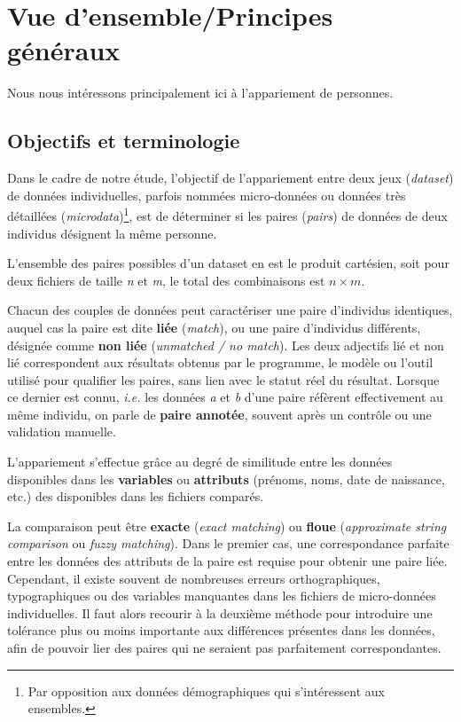 \documentclass[a4paper,12pt,twoside]{book}
\begin{document}
		\section{Vue d'ensemble/Principes généraux}
		
		    Nous nous intéressons principalement ici à l'appariement de personnes.
			    \subsection{Objectifs et terminologie}
			 
			    Dans le cadre de notre étude, l'objectif de l'appariement entre deux jeux (\textit{dataset}) de données individuelles, parfois nommées micro-données ou données très détaillées (\textit{microdata})\footnote{Par opposition aux données démographiques qui s'intéressent aux ensembles.}, est de déterminer si les paires (\textit{pairs}) de données de deux individus désignent la même personne.
			    
			    L'ensemble des paires possibles d'un dataset en est le produit cartésien, soit pour deux fichiers de taille \textit{n} et \textit{m}, le total des combinaisons est $n\times m$.
			    
			    Chacun des couples de données peut caractériser une paire d’individus identiques, auquel cas la paire est dite \textbf{liée} (\textit{match}), ou une paire d’individus différents, désignée comme \textbf{non liée} (\textit{unmatched / no match}). Les deux adjectifs \og{}lié\fg{} et \og{}non lié\fg{} correspondent aux résultats obtenus par le programme, le modèle ou l'outil utilisé pour qualifier les paires, sans lien avec le statut réel du résultat. Lorsque ce dernier est connu, \textit{i.e.} les données \textit{a} et \textit{b} d'une paire réfèrent effectivement au même individu, on parle de \textbf{paire annotée}, souvent après un contrôle ou une validation manuelle.
			    
			    L'appariement s'effectue grâce au degré de similitude entre les données disponibles dans les \textbf{variables} ou \textbf{attributs} (prénoms, noms, date de naissance, etc.) des disponibles dans les fichiers comparés.
			    
			    La comparaison peut être \textbf{exacte} (\textit{exact matching}) ou \textbf{floue} (\textit{approximate string comparison} ou \textit{fuzzy matching}). Dans le premier cas, une correspondance parfaite entre les données des attributs de la paire est requise pour obtenir une paire liée. Cependant, il existe souvent de nombreuses erreurs orthographiques, typographiques ou des variables manquantes dans les fichiers de micro-données individuelles. Il faut alors recourir à la deuxième méthode pour introduire une tolérance plus ou moins importante aux différences présentes dans les données, afin de pouvoir lier des paires qui ne seraient pas parfaitement correspondantes.
			    
\end{document}
